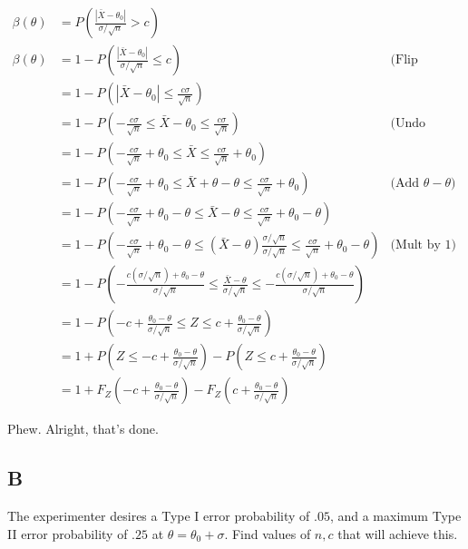 \begin{align*}
	\beta(\theta) &= P\left( \frac{|\bar{X} - \theta_0|}{\sigma / \sqrt{n}} > c \right) \\ 
	\beta(\theta) &= 1 - P\left( \frac{|\bar{X} - \theta_0|}{\sigma / \sqrt{n}} \leq c \right) & \text{(Flip probability)} \\
	&= 1- P\left(|\bar{X} - \theta_0| \leq \frac{c\sigma}{\sqrt{n}} \right) \\
	&= 1 - P\left( -\frac{c\sigma}{\sqrt{n}} \leq \bar{X} - \theta_0 \leq \frac{c\sigma}{\sqrt{n}} \right) & \text{(Undo Absolute Val)} \\
	&= 1 - P\left( -\frac{c\sigma}{\sqrt{n}} + \theta_0 \leq \bar{X} \leq \frac{c\sigma}{\sqrt{n}} + \theta_0 \right) \\
	&= 1 - P\left( -\frac{c\sigma}{\sqrt{n}} + \theta_0 \leq \bar{X} + \theta - \theta \leq \frac{c\sigma}{\sqrt{n}} + \theta_0 \right) & \text{(Add } \theta - \theta) \\
	&= 1 - P\left( -\frac{c\sigma}{\sqrt{n}} + \theta_0 - \theta \leq \bar{X} - \theta \leq \frac{c\sigma}{\sqrt{n}} + \theta_0 - \theta \right) \\
	&= 1 - P\left( -\frac{c\sigma}{\sqrt{n}} + \theta_0 - \theta \leq (\bar{X} - \theta) \frac{\sigma/\sqrt{n}}{\sigma/\sqrt{n}} \leq \frac{c\sigma}{\sqrt{n}} + \theta_0 - \theta \right)
	& \text{(Mult by 1)} \\
	&= 1 - P\left( 
	-\frac{c(\sigma/\sqrt{n}) + \theta_0 - \theta}{\sigma/\sqrt{n}} 
	\leq \frac{\bar{X} - \theta}{\sigma/\sqrt{n}} 
	\leq -\frac{c(\sigma/\sqrt{n}) + \theta_0 - \theta}{\sigma/\sqrt{n}}  
	\right) \\
	&= 1 - P\left( -c + \frac{\theta_0 - \theta}{\sigma/\sqrt{n}} \leq Z \leq c + \frac{\theta_0 - \theta}{\sigma/\sqrt{n}} \right) \\
	&= 1 + P\left( Z \leq -c + \frac{\theta_0 - \theta}{\sigma/\sqrt{n}} \right) -  P\left( Z \leq c + \frac{\theta_0 - \theta}{\sigma/\sqrt{n}} \right) \\
	&= 1 + F_{Z}\left( -c + \frac{\theta_0 - \theta}{\sigma/\sqrt{n}} \right) - F_{Z}\left(  c + \frac{\theta_0 - \theta}{\sigma/\sqrt{n}} \right)
\end{align*}

Phew. Alright, that's done.

\subsection{B}

The experimenter desires a Type I error probability of $.05$, and a maximum Type II error probability of $.25$ at $\theta = \theta_0 + \sigma$. Find values of $n,c$ that will achieve this.

